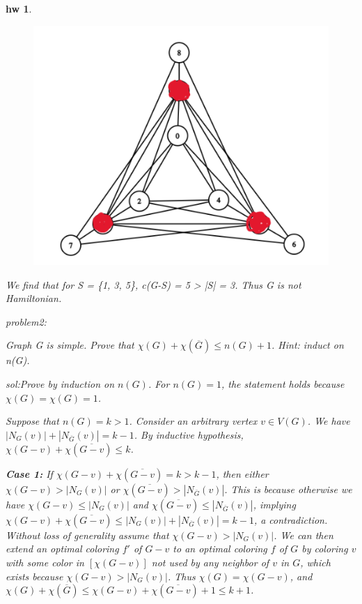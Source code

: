 \documentclass[twocolumn]{article}
\newtheorem{hw}{hw}
\begin{document}
\begin{CJK*}{UTF8}{bkai}
\begin{hw}
\begin{figure}[H]
    \centering
    \includegraphics[scale = 0.1]{hw.png}
\end{figure}

We find that for S = \{1, 3, 5\}, c(G-S) = 5 > |S| = 3. Thus G is not Hamiltonian.

problem2:

Graph G is simple. Prove that $\chi(G) + \chi(\overline{G}) \leq n(G) + 1$. Hint: induct on n(G).

sol:Prove by induction on $n(G)$. For $n(G) = 1$, the statement holds because $\chi(G) = \chi(G) = 1$.

Suppose that $n(G) = k > 1$. Consider an arbitrary vertex $v \in V(G)$. We have $|N_G(v)| + |N_{\overline{G}}(v)| = k - 1$. By inductive hypothesis, $\chi(G - v) + \chi(\overline{G - v}) \leq k$.

\textbf{Case 1:} If $\chi(G - v) + \chi(\overline{G - v}) = k > k - 1$, then either $\chi(G - v) > |N_G(v)|$ or $\chi(\overline{G - v}) > |N_{\overline{G}}(v)|$. This is because otherwise we have $\chi(G - v) \leq |N_G(v)|$ and $\chi(\overline{G - v}) \leq |N_{\overline{G}}(v)|$, implying $\chi(G - v) + \chi(\overline{G - v}) \leq |N_G(v)| + |N_{\overline{G}}(v)| = k - 1$, a contradiction. Without loss of generality assume that $\chi(G - v) > |N_G(v)|$. We can then extend an optimal coloring $f'$ of $G - v$ to an optimal coloring $f$ of $G$ by coloring $v$ with some color in $[\chi(G - v)]$ not used by any neighbor of $v$ in $G$, which exists because $\chi(G - v) > |N_G(v)|$. Thus $\chi(G) = \chi(G - v)$, and $\chi(G) + \chi(\overline{G}) \leq \chi(G - v) + \chi(\overline{G - v}) + 1 \leq k + 1$.


\end{hw}
\end{CJK*}
\end{document}
